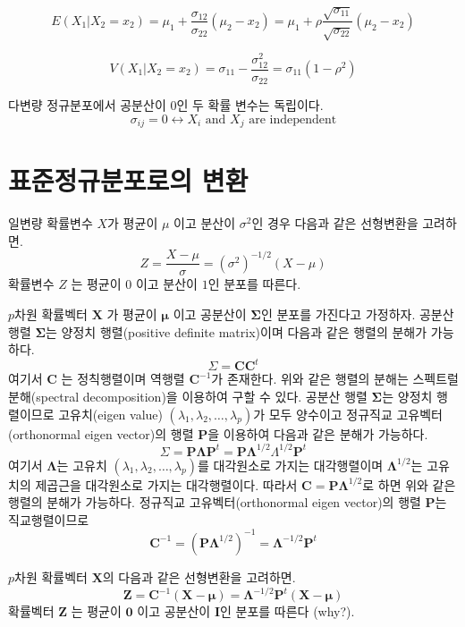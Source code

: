 \documentclass[
  10pt,
]{book}
\theoremstyle{definition}
\theoremstyle{definition}
\theoremstyle{definition}
\theoremstyle{definition}
\theoremstyle{remark}
\begin{document}
\[ 
  E( X_1 |  X_2 =  x_2 ) =  \mu_1 +  \frac{\sigma_{12}}{\sigma_{22}} ( \mu_2 -  x_2)  = \mu_1 +  \rho \frac{\sqrt{\sigma_{11}}}{\sqrt{\sigma_{22}}} ( \mu_2 -  x_2) \]

\[
  V( X_1 |  X_2 =  x_2 )  =  \sigma_{11} - \frac{\sigma^2_{12}}{\sigma_{22}}  = \sigma_{11}(1-\rho^2)
  \]

다변량 정규분포에서 공분산이 0인 두 확률 변수는 독립이다.
\[ \sigma_{ij} = 0 \leftrightarrow X_i \text{ and } X_j \text{ are independent} \]

\hypertarget{uxd45cuxc900uxc815uxaddcuxbd84uxd3ecuxb85cuxc758-uxbcc0uxd658}{%
\section{표준정규분포로의 변환}\label{uxd45cuxc900uxc815uxaddcuxbd84uxd3ecuxb85cuxc758-uxbcc0uxd658}}

일변량 확률변수 \(X\)가 평균이 \(\mu\) 이고 분산이 \(\sigma^2\)인 경우 다음과 같은 선형변환을 고려하면.
\[ Z = \frac{X - \mu}{\sigma} = (\sigma^2)^{-1/2} (X-\mu) \]
확률변수 \(Z\) 는 평균이 \(0\) 이고 분산이 \(1\)인 분포를 따른다.

\(p\)차원 확률벡터 \(\bm X\) 가 평균이 \(\bm \mu\) 이고 공분산이 \(\bm \Sigma\)인 분포를 가진다고 가정하자.
공분산 행렬 \(\bm \Sigma\)는 양정치 행렬(positive definite matrix)이며 다음과 같은 행렬의 분해가 가능하다.
\[ \Sigma = \bm C \bm C^t \]
여기서 \(\bm C\) 는 정칙행렬이며 역행렬 \(\bm C^{-1}\)가 존재한다.
위와 같은 행렬의 분해는 스펙트럴 분해(spectral decomposition)을 이용하여 구할 수 있다. 공분산 행렬 \(\bm \Sigma\)는 양정치 행렬이므로 고유치(eigen value) \((\lambda_1, \lambda_2,\dots, \lambda_p)\)가 모두 양수이고 정규직교 고유벡터(orthonormal eigen vector)의 행렬 \(\bm P\)을 이용하여 다음과 같은 분해가 가능하다.
\[ \Sigma = \bm P \bm \Lambda \bm P^t = \bm P \bm \Lambda^{1/2} \Lambda^{1/2} \bm P^t \]
여기서 \(\bm \Lambda\)는 고유치 \((\lambda_1, \lambda_2,\dots, \lambda_p)\)를 대각원소로 가지는
대각행렬이며 \(\bm \Lambda^{1/2}\)는 고유치의 제곱근을 대각원소로 가지는
대각행렬이다. 따라서 \(\bm C = \bm P \bm \Lambda^{1/2}\)로 하면 위와 같은 행렬의 분해가 가능하다.
정규직교 고유벡터(orthonormal eigen vector)의 행렬 \(\bm P\)는 직교행렬이므로
\[ \bm C^{-1} =  (\bm P \bm \Lambda^{1/2})^{-1} = \bm \Lambda^{-1/2} \bm P^t \]

\(p\)차원 확률벡터 \(\bm X\)의 다음과 같은 선형변환을 고려하면.
\[ \bm Z = \bm C^{-1} ( \bm X- \bm \mu) = \bm \Lambda^{-1/2} \bm P^t ( \bm X- \bm \mu)  \]
확률벡터 \(\bm Z\) 는 평균이 \(\bm 0\) 이고 공분산이 \(\bm I\)인 분포를 따른다 (why?).
\end{document}

